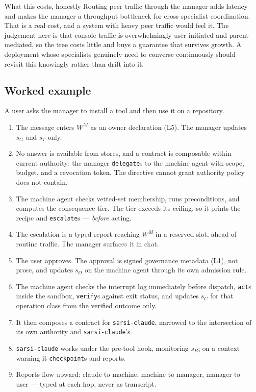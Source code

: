 \documentclass[11pt]{article}
\newcommand{\code}[1]{\texttt{\small #1}}
\begin{document}
\begin{notebox}{What this costs, honestly}
Routing peer traffic through the manager adds latency and makes the manager a throughput bottleneck for cross-specialist coordination. That is a real cost, and a system with heavy peer traffic would feel it. The judgement here is that console traffic is overwhelmingly user-initiated and parent-mediated, so the tree costs little and buys a guarantee that survives growth. A deployment whose specialists genuinely need to converse continuously should revisit this knowingly rather than drift into it.
\end{notebox}

\subsection{Worked example}

A user asks the manager to install a tool and then use it on a repository.

\begin{enumerate}[leftmargin=1.9em,itemsep=2pt]
\item The message enters $W^{M}$ as an owner declaration (L5). The manager updates $s_G$ and $s_T$ only.
\item No answer is available from stores, and a contract is composable within current authority: the manager \code{delegate}s to the machine agent with scope, budget, and a revocation token. The directive cannot grant authority policy does not contain.
\item The machine agent checks vetted-set membership, runs preconditions, and computes the consequence tier. The tier exceeds its ceiling, so it prints the recipe and \code{escalate}s --- \emph{before} acting.
\item The escalation is a typed report reaching $W^{M}$ in a reserved slot, ahead of routine traffic. The manager surfaces it in chat.
\item The user approves. The approval is signed governance metadata (L1), not prose, and updates $s_O$ on the machine agent through its own admission rule.
\item The machine agent checks the interrupt log immediately before dispatch, \code{act}s inside the sandbox, \code{verify}s against exit status, and updates $s_C$ for that operation class from the verified outcome only.
\item It then composes a contract for \code{sarsi-claude}, narrowed to the intersection of its own authority and \code{sarsi-claude}'s.
\item \code{sarsi-claude} works under the pre-tool hook, monitoring $s_B$; on a context warning it \code{checkpoint}s and reports.
\item Reports flow upward: claude to machine, machine to manager, manager to user --- typed at each hop, never as transcript.
\end{enumerate}
\end{document}
